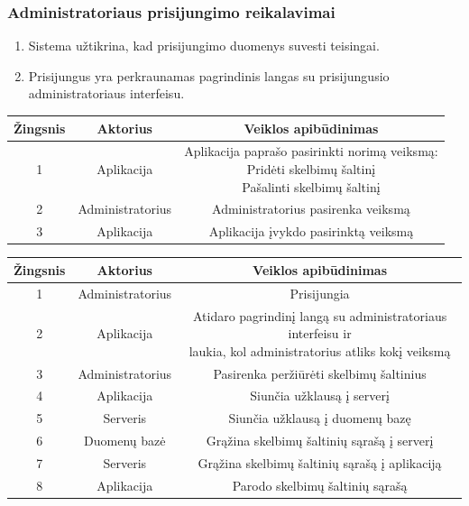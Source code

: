 \documentclass[12pt]{article}
\begin{document}
	\subsubsection{Administratoriaus prisijungimo reikalavimai}
	\begin{enumerate}[labelindent=10pt,leftmargin=2.2cm]
		\item Sistema užtikrina, kad prisijungimo duomenys suvesti teisingai.
		\item Prisijungus yra perkraunamas pagrindinis langas su prisijungusio administratoriaus interfeisu. 
	\end{enumerate}
		
		\begin{center}
		\begin{tabular}{ | c | c | c | }
			\hline
			Žingsnis & Aktorius         & Veiklos apibūdinimas \\ \hline
			1        & Aplikacija       & \makecell{Aplikacija paprašo pasirinkti norimą veiksmą: \\ Pridėti skelbimų šaltinį \\ Pašalinti skelbimų šaltinį} \\ \hline
			2        & Administratorius & Administratorius pasirenka veiksmą \\ \hline
			3        & Aplikacija       & Aplikacija įvykdo pasirinktą veiksmą \\ \hline
		\end{tabular}
		\bigskip

		\begin{tabular}{ | c | c | c | }
			\hline
			Žingsnis & Aktorius         & Veiklos apibūdinimas \\ \hline
			1        & Administratorius & Prisijungia \\ \hline
			2        & Aplikacija       & \makecell{Atidaro pagrindinį langą su administratoriaus interfeisu ir \\ laukia, kol administratorius atliks kokį veiksmą} \\ \hline
			3        & Administratorius & Pasirenka peržiūrėti skelbimų šaltinius \\ \hline
			4        & Aplikacija       & Siunčia užklausą į serverį \\ \hline
			5        & Serveris         & Siunčia užklausą į duomenų bazę \\ \hline
			6        & Duomenų bazė     & Grąžina skelbimų šaltinių sąrašą į serverį \\ \hline
			7        & Serveris         & Grąžina skelbimų šaltinių sąrašą į aplikaciją \\ \hline
			8        & Aplikacija       & Parodo skelbimų šaltinių sąrašą \\ \hline
		\end{tabular}
		\bigskip


\end{center}
\end{document}
